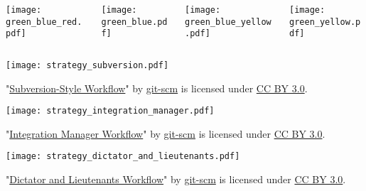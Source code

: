 \documentclass{beamer}
\begin{document}
\begin{frame}
    \begin{columns}[onlytextwidth]
        \begin{column}{0.25\textwidth}
            \texttt{[image: green\_blue\_red.pdf]}
        \end{column}
        \pause
        \begin{column}{0.25\textwidth}
\begin{minipage}{\textwidth}
            \vspace{3cm}
            \texttt{[image: green\_blue.pdf]}
\end{minipage}
        \end{column}
        \pause
        \begin{column}{0.25\textwidth}
\begin{minipage}{\textwidth}
            \vspace{3cm}
            \texttt{[image: green\_blue\_yellow.pdf]}
\end{minipage}
        \end{column}
        \pause
        \begin{column}{0.25\textwidth}

            \texttt{[image: green\_yellow.pdf]}
        \end{column}
    \end{columns}
\end{frame}

\begin{frame}
    \centering
    \texttt{[image: strategy\_subversion.pdf]}

    \vspace{\baselineskip}

    \color{gray}\tiny{"\href{https://git-scm.com/about/distributed}{Subversion-Style Workflow}"
    by \href{https://git-scm.com/}{git-scm} is licensed under 
    \href{https://creativecommons.org/licenses/by/3.0/}{CC BY 3.0}.}
\end{frame}

\begin{frame}
    \centering
    \texttt{[image: strategy\_integration\_manager.pdf]}

    \vspace{\baselineskip}

    \color{gray}\tiny{"\href{https://git-scm.com/about/distributed}{Integration Manager Workflow}"
    by \href{https://git-scm.com/}{git-scm} is licensed under 
    \href{https://creativecommons.org/licenses/by/3.0/}{CC BY 3.0}.}
\end{frame}

\begin{frame}
    \centering
    \texttt{[image: strategy\_dictator\_and\_lieutenants.pdf]}

    \vspace{\baselineskip}

    \color{gray}\tiny{"\href{https://git-scm.com/about/distributed}{Dictator and Lieutenants Workflow}"
    by \href{https://git-scm.com/}{git-scm} is licensed under 
    \href{https://creativecommons.org/licenses/by/3.0/}{CC BY 3.0}.}
\end{frame}
\end{document}

